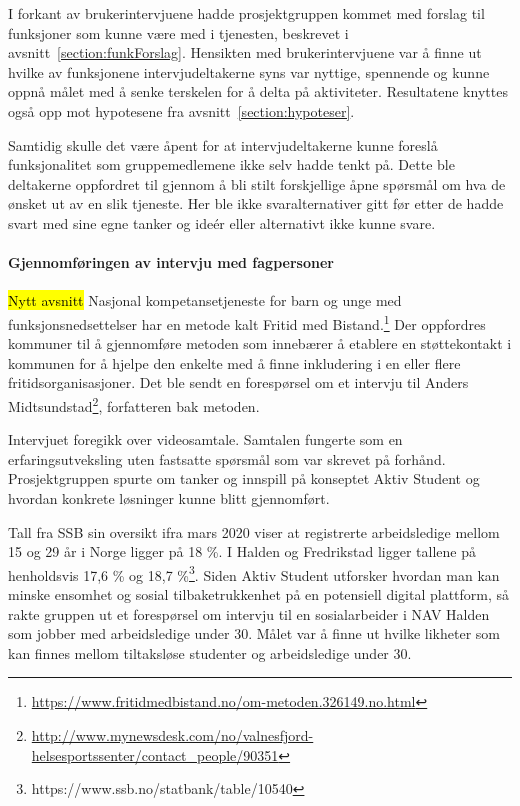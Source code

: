I forkant av brukerintervjuene hadde prosjektgruppen kommet med forslag til funksjoner som kunne være med i tjenesten, beskrevet i avsnitt~\ref{section:funkForslag}. Hensikten med brukerintervjuene var å finne ut hvilke av funksjonene intervjudeltakerne syns var nyttige, spennende og kunne oppnå målet med å senke terskelen for å delta på aktiviteter. Resultatene knyttes også opp mot hypotesene fra avsnitt~\ref{section:hypoteser}.

Samtidig skulle det være åpent for at intervjudeltakerne kunne foreslå funksjonalitet som gruppemedlemene ikke selv hadde tenkt på. Dette ble deltakerne oppfordret til gjennom å bli stilt forskjellige åpne spørsmål om hva de ønsket ut av en slik tjeneste. Her ble ikke svaralternativer gitt før etter de hadde svart med sine egne tanker og ideér eller alternativt ikke kunne svare.

\paragraph{Gjennomføringen av intervju med fagpersoner}

\vspace{5mm} %
\hl{Nytt avsnitt}
Nasjonal kompetansetjeneste for barn og unge med funksjonsnedsettelser har en metode kalt Fritid med Bistand.\footnote{\url{https://www.fritidmedbistand.no/om-metoden.326149.no.html}} Der oppfordres kommuner til å gjennomføre metoden som innebærer å etablere en støttekontakt i kommunen for å hjelpe den enkelte med å finne inkludering i en eller flere fritidsorganisasjoner. Det ble sendt en forespørsel om et intervju til Anders Midtsundstad\footnote{\url{http://www.mynewsdesk.com/no/valnesfjord-helsesportssenter/contact_people/90351}}, forfatteren bak metoden.
 
 \vspace{5mm} %
Intervjuet foregikk over videosamtale. Samtalen fungerte som en erfaringsutveksling uten fastsatte spørsmål som var skrevet på forhånd. Prosjektgruppen spurte om tanker og innspill på konseptet Aktiv Student og hvordan konkrete løsninger kunne blitt gjennomført.

\vspace{10mm} %


Tall fra SSB sin oversikt ifra mars 2020 viser at registrerte arbeidsledige mellom 15 og 29 år i Norge ligger på 18 \%. I Halden og Fredrikstad ligger tallene på henholdsvis 17,6 \% og 18,7 \%\footnote{https://www.ssb.no/statbank/table/10540}.
Siden Aktiv Student utforsker hvordan man kan minske ensomhet og sosial tilbaketrukkenhet på en potensiell digital plattform, så rakte gruppen ut et forespørsel om intervju til en sosialarbeider i NAV Halden som jobber med arbeidsledige under 30. Målet var å finne ut hvilke likheter som kan finnes mellom tiltaksløse studenter og arbeidsledige under 30.

